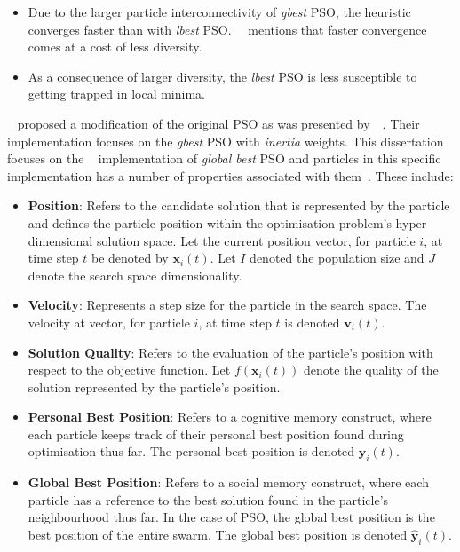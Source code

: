 \begin{itemize}
	\item Due to the larger particle interconnectivity of \textit{gbest} \acs{PSO}, the heuristic converges faster than with \textit{lbest} \acs{PSO}.~\citeauthor{ref:engelbrecht:2007}~\cite{ref:engelbrecht:2007} mentions that faster convergence comes at a cost of less diversity.

	\item As a consequence of larger diversity, the \textit{lbest} \acs{PSO} is less susceptible to getting trapped in local minima.
\end{itemize}

\citeauthor{ref:shi:1998}~\cite{ref:shi:1998} proposed a modification of the original \acs{PSO} as was presented by~\citeauthor{ref:kennedy:1995}~\cite{ref:kennedy:1995}. Their implementation focuses on the \textit{gbest} \acs{PSO} with \textit{inertia} weights. This dissertation focuses on the \citeauthor{ref:shi:1998}~\cite{ref:shi:1998} implementation of \textit{global best} \acs{PSO} and particles in this specific implementation has a number of properties associated with them~\cite{ref:vanwyk:2014}. These include:

\begin{itemize}
	\item \textbf{Position}: Refers to the candidate solution that is represented by the particle and defines the particle position within the optimisation problem's hyper-dimensional solution space. Let the current position vector, for particle $i$, at time step $t$ be denoted by $\boldsymbol{x}_{i}(t)$. Let $I$ denoted the population size and $J$ denote the search space dimensionality.

	\item \textbf{Velocity}: Represents a step size for the particle in the search space. The velocity at vector, for particle $i$, at time step $t$ is denoted $\boldsymbol{v}_{i}(t)$.

	\item \textbf{Solution Quality}: Refers to the evaluation of the particle's position with respect to the objective function. Let $f(\boldsymbol{x}_{i}(t))$ denote the quality of the solution represented by the particle's position.

	\item \textbf{Personal Best Position}: Refers to a cognitive memory construct, where each particle keeps track of their personal best position found during optimisation thus far. The personal best position is denoted $\boldsymbol{y}_{i}(t)$.

	\item \textbf{Global Best Position}: Refers to a social memory construct, where each particle has a reference to the best solution found in the particle's neighbourhood thus far. In the case of  \acs{PSO}, the global best position is the best position of the entire swarm. The global best position is denoted $\boldsymbol{\hat{y}}_{i}(t)$.
\end{itemize}

